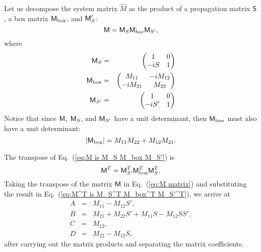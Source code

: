 \documentclass[11pt,twocolumn]{article}
\begin{document}
Let us decompose the system matrix $\hat M$ as the product of a propagation matrix $\textsf S$, a box matrix $\textsf M_{\textrm{box}}$, and $\textsf M_S'$:\cite{SugonMcNamara_2008_arXiv0812.0664v1_p6}
\begin{equation}
\label{eq:M is M_S M_box M_S'}
\textsf M=\textsf M_S\textsf M_{box}\textsf M_{S'},
\end{equation}
where
\begin{eqnarray}
\label{eq:M_S}
\textsf M_S&=&
\begin{pmatrix}
1&0\\
-iS&1
\end{pmatrix}
\\
\label{eq:M_box}
\textsf M_{\textrm{box}}&=&
\begin{pmatrix}
M_{11}&-iM_{12}\\
-iM_{21}&M_{22}
\end{pmatrix}
\\
\label{eq:M_S'}
\textsf M_{S'}&=&
\begin{pmatrix}
1&0\\
-iS'&1
\end{pmatrix}
\end{eqnarray}
Notice that since $\textsf M$, $\textsf M_S$, and $\textsf M_{S'}$ have a unit determinant, then $\textsf M_{\textrm{box}}$ must also have a unit determinant:
\begin{equation}
\label{eq:det M_box is 1}
|\textsf M_{\textrm{box}}|=M_{11}M_{22}+M_{12}M_{21}.
\end{equation}


The transpose of Eq.~(\ref{eq:M is M_S M_box M_S'}) is
\begin{equation}
\label{eq:M^T is M_S^T M_box^T M_S'^T}
\textsf M^T=\textsf M_{S'}^T\textsf M_{\textrm{box}}^T\textsf M_S^T.
\end{equation}
Taking the transpose of the matrix $\textsf M$ in Eq.~(\ref{eq:M matrix}) and substituting the result in Eq.~(\ref{eq:M^T is M_S^T M_box^T M_S'^T}), we arrive at
\begin{eqnarray}
\label{eq:A element}
A&=&M_{11}-M_{12}S',\\
\label{eq:B element}
B&=&M_{21}+M_{22}S' +M_{11}S-M_{12}SS',\\
\label{eq:C element}
C&=&M_{12},\\
\label{eq:D element}
D&=&M_{22}-M_{12}S,
\end{eqnarray}
after carrying out the matrix products and separating the matrix coefficients.
\end{document}
